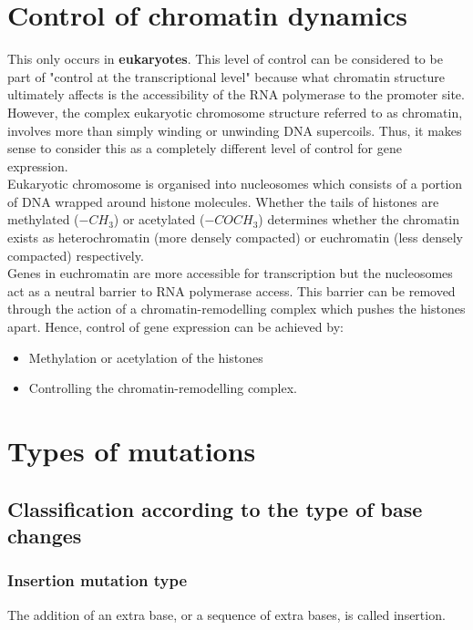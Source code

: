 \documentclass[11pt]{article}
\begin{document}
\section{Control of chromatin dynamics}
\label{sec:orge97d45d}
This only occurs in \textbf{eukaryotes}. This level of control can be considered to be part of "control at the transcriptional level" because what chromatin structure ultimately affects is the accessibility of the RNA polymerase to the promoter site. However, the complex eukaryotic chromosome structure referred to as chromatin, involves more than simply winding or unwinding DNA supercoils. Thus, it makes sense to consider this as a completely different level of control for gene expression.
\\[0pt]

Eukaryotic chromosome is organised into nucleosomes which consists of a portion of DNA wrapped around histone molecules. Whether the tails of histones are methylated (\(-CH_3\)) or acetylated (\(-COCH_3\)) determines whether the chromatin exists as heterochromatin (more densely compacted) or euchromatin (less densely compacted) respectively.
\\[0pt]

Genes in euchromatin are more accessible for transcription but the nucleosomes act as a neutral barrier to RNA polymerase access. This barrier can be removed through the action of a chromatin-remodelling complex which pushes the histones apart. Hence, control of gene expression can be achieved by:
\begin{itemize}
\item Methylation or acetylation of the histones
\item Controlling the chromatin-remodelling complex.
\end{itemize}

\newpage

\section{Types of mutations}
\label{sec:org53e0a9f}

\subsection{Classification according to the type of base changes}
\label{sec:org9082c38}

\subsubsection{Insertion mutation type}
\label{sec:orge513b05}
The addition of an extra base, or a sequence of extra bases, is called insertion.
\end{document}
